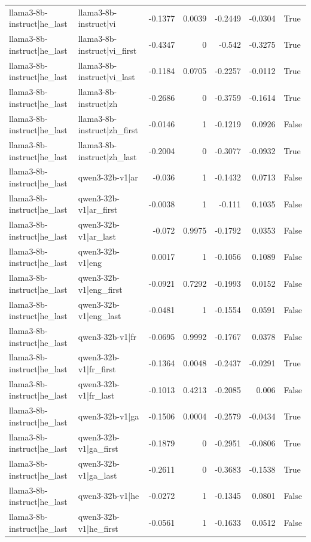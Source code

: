 \begin{table}
\begin{tabular}{l l r r r r l}
llama3-8b-instruct|he_last & llama3-8b-instruct|vi & -0.1377 & 0.0039 & -0.2449 & -0.0304 & True \\
llama3-8b-instruct|he_last & llama3-8b-instruct|vi_first & -0.4347 & 0 & -0.542 & -0.3275 & True \\
llama3-8b-instruct|he_last & llama3-8b-instruct|vi_last & -0.1184 & 0.0705 & -0.2257 & -0.0112 & True \\
llama3-8b-instruct|he_last & llama3-8b-instruct|zh & -0.2686 & 0 & -0.3759 & -0.1614 & True \\
llama3-8b-instruct|he_last & llama3-8b-instruct|zh_first & -0.0146 & 1 & -0.1219 & 0.0926 & False \\
llama3-8b-instruct|he_last & llama3-8b-instruct|zh_last & -0.2004 & 0 & -0.3077 & -0.0932 & True \\
llama3-8b-instruct|he_last & qwen3-32b-v1|ar & -0.036 & 1 & -0.1432 & 0.0713 & False \\
llama3-8b-instruct|he_last & qwen3-32b-v1|ar_first & -0.0038 & 1 & -0.111 & 0.1035 & False \\
llama3-8b-instruct|he_last & qwen3-32b-v1|ar_last & -0.072 & 0.9975 & -0.1792 & 0.0353 & False \\
llama3-8b-instruct|he_last & qwen3-32b-v1|eng & 0.0017 & 1 & -0.1056 & 0.1089 & False \\
llama3-8b-instruct|he_last & qwen3-32b-v1|eng_first & -0.0921 & 0.7292 & -0.1993 & 0.0152 & False \\
llama3-8b-instruct|he_last & qwen3-32b-v1|eng_last & -0.0481 & 1 & -0.1554 & 0.0591 & False \\
llama3-8b-instruct|he_last & qwen3-32b-v1|fr & -0.0695 & 0.9992 & -0.1767 & 0.0378 & False \\
llama3-8b-instruct|he_last & qwen3-32b-v1|fr_first & -0.1364 & 0.0048 & -0.2437 & -0.0291 & True \\
llama3-8b-instruct|he_last & qwen3-32b-v1|fr_last & -0.1013 & 0.4213 & -0.2085 & 0.006 & False \\
llama3-8b-instruct|he_last & qwen3-32b-v1|ga & -0.1506 & 0.0004 & -0.2579 & -0.0434 & True \\
llama3-8b-instruct|he_last & qwen3-32b-v1|ga_first & -0.1879 & 0 & -0.2951 & -0.0806 & True \\
llama3-8b-instruct|he_last & qwen3-32b-v1|ga_last & -0.2611 & 0 & -0.3683 & -0.1538 & True \\
llama3-8b-instruct|he_last & qwen3-32b-v1|he & -0.0272 & 1 & -0.1345 & 0.0801 & False \\
llama3-8b-instruct|he_last & qwen3-32b-v1|he_first & -0.0561 & 1 & -0.1633 & 0.0512 & False \\

\end{tabular}
\end{table}
